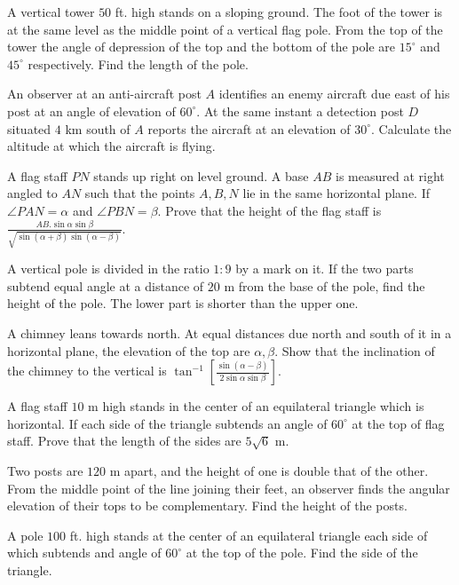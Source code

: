 \item A vertical tower $50$ ft. high stands on a sloping ground. The foot of the tower is at the same level as the middle
  point of a vertical flag pole. From the top of the tower the angle of depression of the top and the bottom of the pole are
  $15^\circ$ and $45^\circ$ respectively. Find the length of the pole.

\item An observer at an anti-aircraft post $A$ identifies an enemy aircraft due east of his post at an angle of elevation of
  $60^\circ$. At the same instant a detection post $D$ situated $4$ km south of $A$ reports the aircraft
  at an elevation of $30^\circ$. Calculate the altitude at which the aircraft is flying.

\item A flag staff $PN$ stands up right on level ground. A base $AB$ is measured at right angled to $AN$ such that
  the points $A, B, N$ lie in the same horizontal plane. If $\angle PAN = \alpha$ and $\angle PBN =
  \beta$. Prove that the height of the flag staff is $\frac{AB.\sin\alpha\sin\beta}{\sqrt{\sin(\alpha +
      \beta)\sin(\alpha - \beta)}}$.

\item A vertical pole is divided in the ratio $1:9$ by a mark on it. If the two parts subtend equal angle at a distance of
  $20$ m from the base of the pole, find the height of the pole. The lower part is shorter than the upper one.

\item A chimney leans towards north. At equal distances due north and south of it in a horizontal plane, the elevation of the top
  are $\alpha,\beta$. Show that the inclination of the chimney to the vertical is
  $\tan^{-1}\left[\frac{\sin(\alpha - \beta)}{2\sin\alpha\sin\beta}\right]$.

\item A flag staff $10$ m high stands in the center of an equilateral triangle which is horizontal. If each side of the
  triangle subtends an angle of $60^\circ$ at the top of flag staff. Prove that the length of the sides are
  $5\sqrt{6}$ m.

\item Two posts are $120$ m apart, and the height of one is double that of the other. From the middle point of the line
  joining their feet, an observer finds the angular elevation of their tops to be complementary. Find the height of the posts.

\item A pole $100$ ft. high stands at the center of an equilateral triangle each side of which subtends and angle of
  $60^\circ$ at the top of the pole. Find the side of the triangle.

